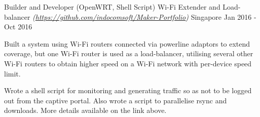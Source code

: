 \begin{cventries}

\cventry
    {Builder and Developer (OpenWRT, Shell Script)} %
    {Wi-Fi Extender and Load-balancer \textmd{\em\tiny (\url{https://github.com/indocomsoft/Maker-Portfolio})}} %
    {Singapore} %
    {Jan 2016 - Oct 2016} %
    {
      \begin{cvitems} %
      	\item {Built a system using Wi-Fi routers connected via powerline adaptors to extend coverage, but one Wi-Fi router is used as a load-balancer, utilising several other Wi-Fi routers to obtain higher speed on a Wi-Fi network with per-device speed limit.}
      	\item {Wrote a shell script for monitoring and generating traffic so as not to be logged out from the captive portal. Also wrote a script to parallelise rsync and downloads. More details available on the link above.}
      \end{cvitems}
    }
\end{cventries}

